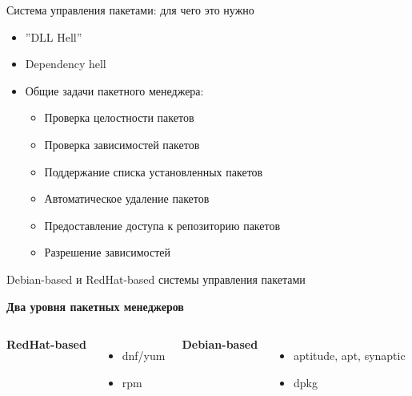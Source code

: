 \begin{frame}{Система управления пакетами: для чего это нужно}
\begin{itemize}
 \item ''DLL Hell''
 \pause
 \item Dependency hell
 \pause
 \item Общие задачи пакетного менеджера:
   \begin{itemize}
     \item Проверка целостности пакетов
     \item Проверка зависимостей пакетов
        \item Поддержание списка установленных пакетов
        \item Автоматическое удаление пакетов
     \item Предоставление доступа к репозиторию пакетов
     \item Разрешение зависимостей
   \end{itemize}
\end{itemize}
\end{frame}

\begin{frame}{Debian-based и RedHat-based системы управления пакетами}
\begin{center}
 \textbf{Два уровня пакетных менеджеров}
\end{center}
\begin{columns}
  \begin{center}
    \textbf{RedHat-based}
  \end{center}
  \begin{itemize}
    \item dnf/yum
    \item rpm
  \end{itemize}
  \begin{center}
    \textbf{Debian-based}
  \end{center}
  \begin{itemize}
    \item aptitude, apt, synaptic
    \item dpkg
  \end{itemize}
\end{columns}
\end{frame}
